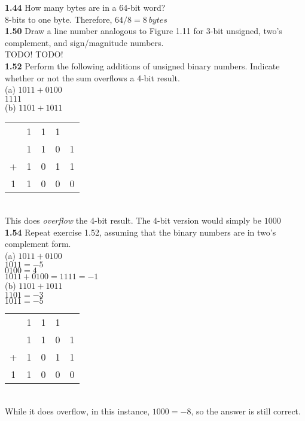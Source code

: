 \documentclass[12pt,a4paper]{report}
\begin{document}
\begin{normalsize}
\textbf{1.44} How many bytes are in a 64-bit word? \\
8-bits to one byte. Therefore, $ 64/8 = 8\: bytes $ \\

\textbf{1.50} Draw a line number analogous to Figure 1.11 for 3-bit unsigned, two's complement, and sign/magnitude numbers. \\
TODO! TODO! \\

\textbf{1.52} Perform the following additions of unsigned binary numbers. Indicate whether or not the sum overflows a 4-bit result. \\
(a) $ 1011 + 0100 $ \\
$ 1111 $ \\

(b) $ 1101 + 1011 $ \\
\begin{tabular}{c@{\,}c@{\,}c@{\,}c@{\,}c}
  & 1 & 1 & 1 & \\
  & 1 & 1 & 0 & 1 \\
+ & 1 & 0 & 1 & 1 \\
\hline
1 & 1 & 0 & 0 & 0 \\
\end{tabular} \\
This does \emph{overflow} the 4-bit result. The 4-bit version would simply be $ 1000 $ \\

\textbf{1.54} Repeat exercise 1.52, assuming that the binary numbers are in two's complement form. \\
(a) $ 1011 + 0100 $ \\
$ 1011 = -5 $ \\
$ 0100 = 4 $ \\
$ 1011 + 0100 = 1111 = -1 $ \\

(b) $ 1101 + 1011 $ \\
$ 1101 = -3 $ \\
$ 1011 = -5 $ \\
\begin{tabular}{c@{\,}c@{\,}c@{\,}c@{\,}c}
  & 1 & 1 & 1 & \\
  & 1 & 1 & 0 & 1 \\
+ & 1 & 0 & 1 & 1 \\
\hline
1 & 1 & 0 & 0 & 0 \\
\end{tabular} \\
While it does overflow, in this instance, $ 1000 = -8 $, so the answer is still correct. \\


\end{normalsize}
\end{document}
